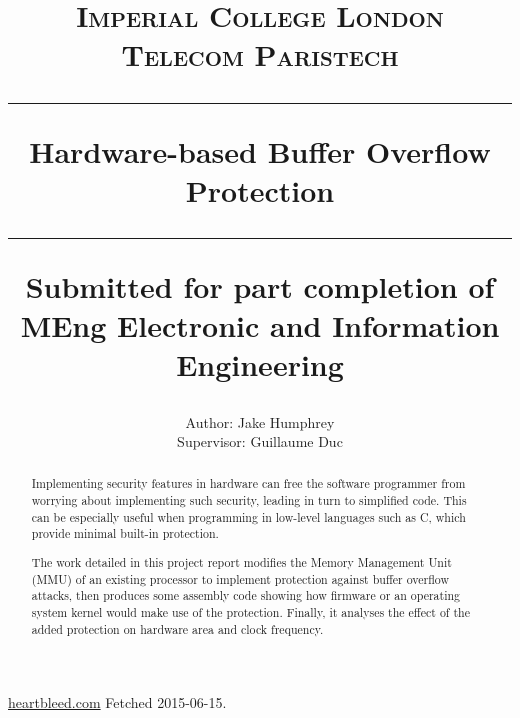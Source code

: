 \documentclass[11pt,a4paper,twoside,openany]{report}
\title{%
{\normalsize\scshape Imperial College London}\\
{\normalsize\scshape Telecom Paristech}\\
\vspace{2em}
\hrule
\vspace{1em}
{\huge\bfseries Hardware-based Buffer Overflow Protection}\\
\vspace{1em}
\hrule
\vspace{1em}
{\small Submitted for part completion of MEng Electronic and Information Engineering}
}
\author{%
Author: Jake Humphrey\\
Supervisor: Guillaume Duc
}
\date{}
\begin{document}
\pagestyle{empty}

\maketitle

\cleardoublepage
\begin{abstract}
Implementing security features in hardware can free the software programmer from worrying about implementing such security, leading in turn to simplified code. This can be especially useful when programming in low-level languages such as C, which provide minimal built-in protection.

The work detailed in this project report modifies the Memory Management Unit (MMU) of an existing processor to implement protection against buffer overflow attacks, then produces some assembly code showing how firmware or an operating system kernel would make use of the protection. Finally, it analyses the effect of the added protection on hardware area and clock frequency.

\end{abstract}

\cleardoublepage
\pagestyle{plain}
\setcounter{page}{1}
\tableofcontents

\newpage
\cleardoublepage
{}






\begin{thebibliography}{9}

  \url{heartbleed.com} Fetched 2015-06-15.

\end{thebibliography}
\end{document}
